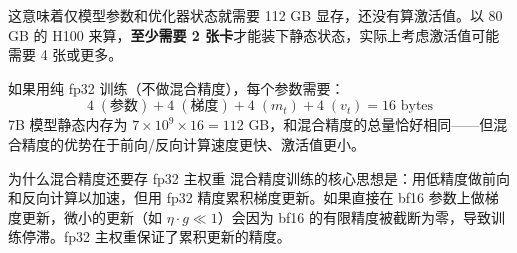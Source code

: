 这意味着仅模型参数和优化器状态就需要 112 GB 显存，还没有算激活值。以 80 GB 的 H100 来算，\textbf{至少需要 2 张卡}才能装下静态状态，实际上考虑激活值可能需要 4 张或更多。

如果用纯 fp32 训练（不做混合精度），每个参数需要：
$$
4\;(\text{参数}) + 4\;(\text{梯度}) + 4\;(m_t) + 4\;(v_t) = 16 \text{ bytes}
$$
7B 模型静态内存为 $7 \times 10^9 \times 16 = 112$ GB，和混合精度的总量恰好相同——但混合精度的优势在于前向/反向计算速度更快、激活值更小。

\begin{knowledgebox}{为什么混合精度还要存 fp32 主权重}
混合精度训练的核心思想是：用低精度做前向和反向计算以加速，但用 fp32 精度累积梯度更新。如果直接在 bf16 参数上做梯度更新，微小的更新（如 $\eta \cdot g \ll 1$）会因为 bf16 的有限精度被截断为零，导致训练停滞。fp32 主权重保证了累积更新的精度。
\end{knowledgebox}


